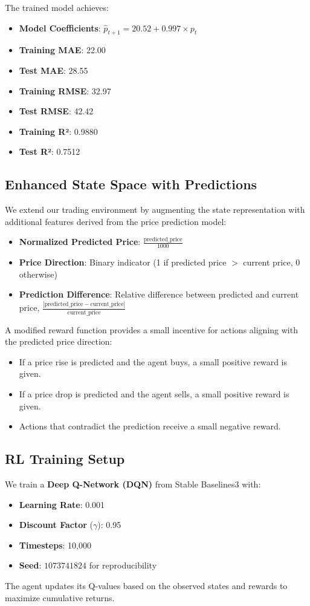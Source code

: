 \documentclass[11pt]{article}
\begin{document}
The trained model achieves:
\begin{itemize}
  \item \textbf{Model Coefficients}: \(\hat{p}_{t+1} = 20.52 + 0.997 \times p_t\)
  \item \textbf{Training MAE}: 22.00
  \item \textbf{Test MAE}: 28.55
  \item \textbf{Training RMSE}: 32.97
  \item \textbf{Test RMSE}: 42.42
  \item \textbf{Training R²}: 0.9880
  \item \textbf{Test R²}: 0.7512
\end{itemize}

\subsection{Enhanced State Space with Predictions}
We extend our trading environment by augmenting the state representation with additional features derived from the price prediction model:
\begin{itemize}
  \item \textbf{Normalized Predicted Price}: \(\frac{\text{predicted\_price}}{1000}\)
  \item \textbf{Price Direction}: Binary indicator (1 if predicted price \(>\) current price, 0 otherwise)
  \item \textbf{Prediction Difference}: Relative difference between predicted and current price, \(\frac{|\text{predicted\_price} - \text{current\_price}|}{\text{current\_price}}\)
\end{itemize}

A modified reward function provides a small incentive for actions aligning with the predicted price direction:
\begin{itemize}
  \item If a price rise is predicted and the agent buys, a small positive reward is given.
  \item If a price drop is predicted and the agent sells, a small positive reward is given.
  \item Actions that contradict the prediction receive a small negative reward.
\end{itemize}

\subsection{RL Training Setup}
We train a \textbf{Deep Q-Network (DQN)} from Stable Baselines3 with:
\begin{itemize}
  \item \textbf{Learning Rate}: 0.001
  \item \textbf{Discount Factor} (\(\gamma\)): 0.95
  \item \textbf{Timesteps}: 10,000
  \item \textbf{Seed}: \(1073741824\) for reproducibility
\end{itemize}
The agent updates its Q-values based on the observed states and rewards to maximize cumulative returns.
\end{document}
